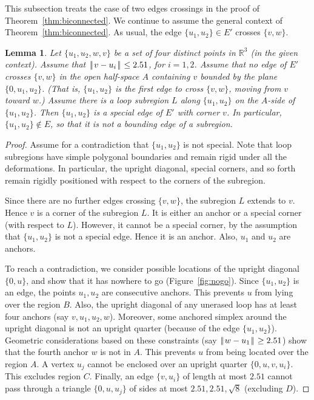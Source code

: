 \documentclass[11pt]{amsart}
\newcommand{\ring}[1]{\mathbb{#1}}
\def\|{{\hskip0.1em|\hskip-0.15em|\hskip0.1em}}
\newtheorem{lemma}{Lemma}
\begin{document}
This subsection treats the case of two edges crossings in the proof
of Theorem~\ref{thm:biconnected}.
We continue to assume the general context of Theorem~\ref{thm:biconnected}.  As usual, 
the edge $\{u_1,u_2\}\in E'$ crosses $\{v,w\}$.

\begin{lemma}\label{lemma:special}
Let $\{u_1,u_2,w,v\}$ be a set of four distinct points
in $\ring{R}^3$ (in the given context).  
Assume that
 $\|v-u_i\|\le 2.51$, for $i=1,2$.
Assume that no edge of $E'$ crosses $\{v,w\}$
in the open 
half-space $A$ containing $v$ bounded by the plane $\{0,u_1,u_2\}$.
(That is, $\{u_1,u_2\}$ is the first edge to cross $\{v,w\}$, moving
from $v$ toward $w$.)
Assume there is a loop subregion $L$ along 
$\{u_1,u_2\}$ on the $A$-side
of $\{u_1,u_2\}$.  Then $\{u_1,u_2\}$ is a special edge of $E'$ with
corner $v$.
In particular, $\{u_1,u_2\}\not\in E$, so that it is not a bounding
edge of a subregion.
\end{lemma}

\begin{proof}
Assume for a contradiction that $\{u_1,u_2\}$ is not special.
Note that loop subregions have simple polygonal boundaries and
remain rigid under all the deformations.  In particular,
the upright diagonal, special corners, and so forth
remain rigidly positioned with respect to the corners of the subregion.

Since there are no further edges crossing $\{v,w\}$, the subregion
$L$ extends to $v$.  Hence $v$ is a corner of the subregion $L$.
It is either an anchor or a special corner (with respect to $L$). However, it cannot be a special
corner, by the assumption that $\{u_1,u_2\}$ is not a special edge.
Hence it is an anchor.  Also, $u_1$ and $u_2$ are anchors.

To reach a contradiction, 
we consider possible locations of the upright diagonal $\{0,u\}$,
and show that it has nowhere to go (Figure~\ref{fig:nogo}).  
Since $\{u_1,u_2\}$ is an edge,
the points $u_1,u_2$ are consecutive anchors. This prevents $u$ from lying over the region $B$.  
Also, the upright diagonal of any
unerased loop has at least four anchors (say $v,u_1,u_2,w$).  Moreover, some anchored simplex around the upright diagonal is not an upright quarter (because of the edge $\{u_1,u_2\}$).  Geometric considerations based
on these constraints (say $\|w-u_1\|\ge 2.51$) show that
the fourth anchor $w$ is not in $A$.  This prevents $u$ from
being located over the region $A$.
A vertex $u_j$ cannot be enclosed over an upright quarter $\{0,u,v,u_i\}$.  This excludes
 region $C$.  Finally, an edge $\{v,u_i\}$
of length at most $2.51$ cannot pass through a triangle $\{0,u,u_j\}$
of sides at most $2.51,2.51,\sqrt8$ (excluding $D$).
\end{proof}
\end{document}
